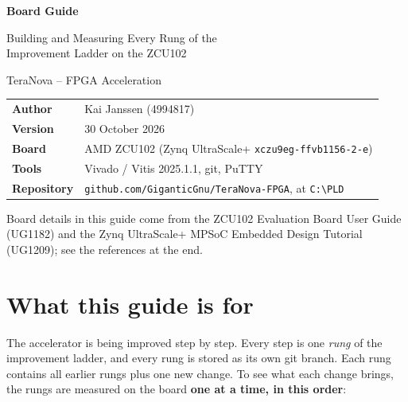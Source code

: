\documentclass[11pt,a4paper]{article}
\newcommand{\code}[1]{\texttt{#1}}
\newcommand{\bs}{\textbackslash\allowbreak{}}
\renewcommand{\_}{\oldunderscore\allowbreak{}}
\begin{document}
\begin{titlepage}
\centering
\vspace*{3cm}
{\LARGE\bfseries Board Guide\par}
\vspace{0.5cm}
{\Large Building and Measuring Every Rung of the\\Improvement Ladder on the ZCU102\par}
\vspace{0.3cm}
{\large TeraNova -- FPGA Acceleration\par}
\vspace{2cm}
\begin{tabular}{@{}ll@{}}
\textbf{Author}          & Kai Janssen (4994817) \\
\textbf{Version}         & 30 October 2026 \\
\textbf{Board}           & AMD ZCU102 (Zynq UltraScale+ \code{xczu9eg-ffvb1156-2-e}) \\
\textbf{Tools}           & Vivado / Vitis 2025.1.1, git, PuTTY \\
\textbf{Repository}      & \code{github.com/GiganticGnu/TeraNova-FPGA}, at \code{C:\bs PLD} \\
\end{tabular}
\vfill
{\small Board details in this guide come from the ZCU102 Evaluation Board User Guide (UG1182) and the Zynq UltraScale+ MPSoC Embedded Design Tutorial (UG1209); see the references at the end.\par}
\end{titlepage}

\tableofcontents
\newpage

\section{What this guide is for}
The accelerator is being improved step by step. Every step is one \emph{rung} of the improvement ladder, and every rung is stored as its own git branch. Each rung contains all earlier rungs plus one new change. To see what each change brings, the rungs are measured on the board \textbf{one at a time, in this order}:
\end{document}
